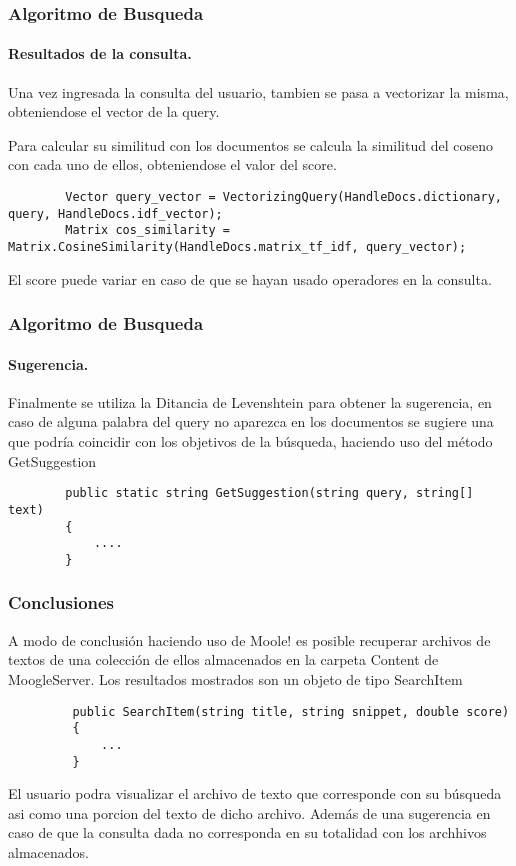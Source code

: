 \documentclass[12pt]{beamer}
\begin{document}
	\begin{frame}[fragile]
		\frametitle{Algoritmo de Busqueda}
		\framesubtitle{Resultados de la consulta.}
		
		Una vez ingresada la consulta del usuario, tambien se pasa a vectorizar la misma, obteniendose el vector de la query.
		
		Para calcular su similitud con los documentos se calcula la similitud del coseno con cada uno de ellos, obteniendose el valor del score.

		\begin{lstlisting}
		Vector query_vector = VectorizingQuery(HandleDocs.dictionary, query, HandleDocs.idf_vector);
		Matrix cos_similarity = Matrix.CosineSimilarity(HandleDocs.matrix_tf_idf, query_vector);
		\end{lstlisting}
		
		El score puede variar en caso de que se hayan usado operadores en la consulta.
	\end{frame}
	
	\begin{frame}[fragile]
		\frametitle{Algoritmo de Busqueda}
		\framesubtitle{Sugerencia.}
			
		Finalmente se utiliza la Ditancia de Levenshtein para obtener la sugerencia, en caso de alguna palabra del query no aparezca en los documentos se sugiere una que podría coincidir con los objetivos de la búsqueda, haciendo uso del método GetSuggestion
			
		\begin{lstlisting}
		public static string GetSuggestion(string query, string[] text)
		{
			....
		}
		\end{lstlisting}
		
	\end{frame}
	
	\begin{frame}[fragile]
		\frametitle{Conclusiones}
		 
		 A modo de conclusión haciendo uso de Moole! es posible recuperar archivos de textos de una colección de ellos almacenados en la carpeta Content de MoogleServer. Los resultados mostrados son un objeto de tipo SearchItem 
		 
		 \begin{lstlisting}
		 public SearchItem(string title, string snippet, double score)
		 {
			 ...
		 }
		 \end{lstlisting}
		 
		 El usuario podra visualizar el archivo de texto que corresponde con su búsqueda asi como una porcion del texto de dicho archivo. Además de una sugerencia en caso de que la consulta dada no corresponda en su totalidad con los archhivos almacenados.
	\end{frame}
	
\end{document}
